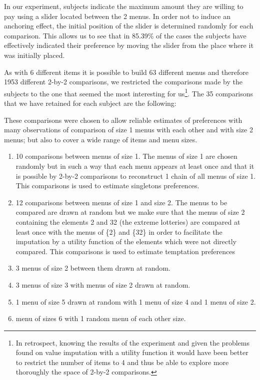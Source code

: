 \documentclass[
]{book}
\providecommand{\tightlist}{%
  \setlength{\itemsep}{0pt}\setlength{\parskip}{0pt}}
\begin{document}
In our experiment, subjects indicate the maximum amount they are willing to pay
using a slider located between the 2 menus.
In order not to induce an anchoring effect, the initial position of the slider
is determined randomly for each comparison.
This allows us to see that in 85.39\% of the
cases the subjects have effectively indicated their preference by moving the
slider from the place where it was initially placed.

As with 6 different items it is possible to build 63 different menus and
therefore 1953 different 2-by-2 comparisons, we restricted the comparisons made
by the subjects to the one that seemed the most interesting for us\footnote{In retrospect, knowing the results of the experiment and given the problems found on value
  imputation with a utility function it would have been better to restrict the
  number of items to 4 and thus be able to explore more thoroughly the space of 2-by-2 comparisons.}.
The 35 comparisons that we have retained for each subject are the following:

These comparisons were chosen to allow reliable estimates of preferences with many
observations of comparison of size 1 menus with each other and with size 2
menus;
but also to cover a wide range of items and menu sizes.

\begin{enumerate}
\def\labelenumi{\arabic{enumi}.}
\tightlist
\item
  10 comparisons between menus of size 1.
  The menus of size 1 are chosen randomly but in such a way that each menu appears
  at least once and that it is possible by 2-by-2 comparisons to reconstruct 1
  chain of all menus of size 1.
  This comparisons is used to estimate singletons preferences.
\item
  12 comparisons between menus of size 1 and size 2.
  The menus to be compared are drawn at random but we make sure that the menus of
  size 2 containing the elements 2 and 32 (the extreme lotteries) are compared at
  least once with the menus of \{2\} and \{32\} in order to facilitate the imputation
  by a utility function of the elements which were not directly compared.
  This comparisons is used to estimate temptation preferences
\item
  3 menus of size 2 between them drawn at random.
\item
  3 menus of size 3 with menus of size 2 drawn at random.
\item
  1 menu of size 5 drawn at random with 1 menu of size 4 and 1 menu of size 2.
\item
  menu of sizes 6 with 1 random menu of each other size.
\end{enumerate}
\end{document}
